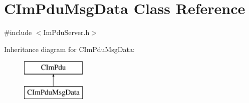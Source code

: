 \hypertarget{class_c_im_pdu_msg_data}{}\section{C\+Im\+Pdu\+Msg\+Data Class Reference}
\label{class_c_im_pdu_msg_data}


{\ttfamily \#include $<$Im\+Pdu\+Server.\+h$>$}

Inheritance diagram for C\+Im\+Pdu\+Msg\+Data\+:\begin{figure}[H]
\begin{center}
\leavevmode
\includegraphics[height=2.000000cm]{class_c_im_pdu_msg_data}
\end{center}
\end{figure}
